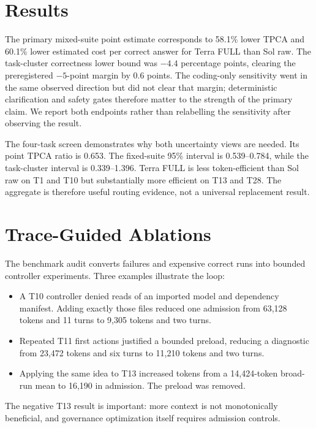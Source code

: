\documentclass[10pt,twocolumn]{article}
\begin{document}
\section{Results}



The primary mixed-suite point estimate corresponds to 58.1\% lower TPCA and
60.1\% lower estimated cost per correct answer for Terra FULL than Sol raw.
The task-cluster correctness lower bound was $-4.4$ percentage points, clearing
the preregistered $-5$-point margin by 0.6 points. The coding-only sensitivity
went in the same observed direction but did not clear that margin; deterministic
clarification and safety gates therefore matter to the strength of the primary
claim. We report both endpoints rather than relabelling the sensitivity after
observing the result.

The four-task screen demonstrates why both uncertainty views are needed. Its
point TPCA ratio is 0.653. The fixed-suite 95\% interval is 0.539--0.784, while
the task-cluster interval is 0.339--1.396. Terra FULL is less token-efficient
than Sol raw on T1 and T10 but substantially more efficient on T13 and T28.
The aggregate is therefore useful routing evidence, not a universal
replacement result.

\section{Trace-Guided Ablations}

The benchmark audit converts failures and expensive correct runs into bounded
controller experiments. Three examples illustrate the loop:
\begin{itemize}
  \item A T10 controller denied reads of an imported model and dependency
        manifest. Adding exactly those files reduced one admission from 63,128
        tokens and 11 turns to 9,305 tokens and two turns.
  \item Repeated T11 first actions justified a bounded preload, reducing a
        diagnostic from 23,472 tokens and six turns to 11,210 tokens and two
        turns.
  \item Applying the same idea to T13 increased tokens from a 14,424-token
        broad-run mean to 16,190 in admission. The preload was removed.
\end{itemize}
The negative T13 result is important: more context is not monotonically
beneficial, and governance optimization itself requires admission controls.
\end{document}
